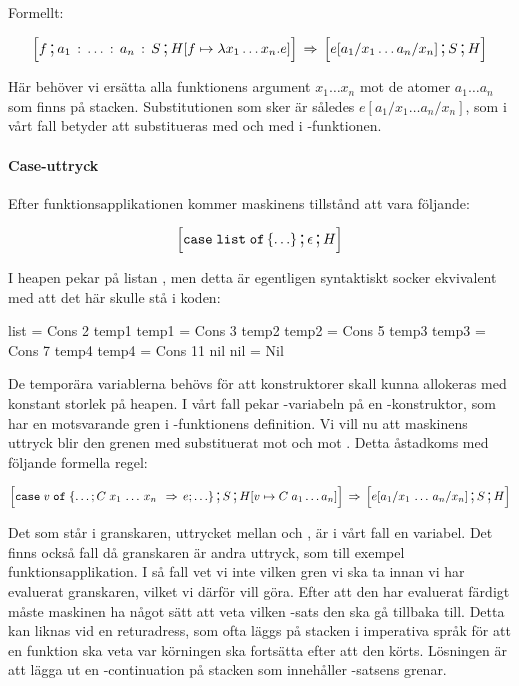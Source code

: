 \documentclass[../Core]{subfiles}
\begin{document}
Formellt:

\[
\text{\large$$}\Big[f \,\text{\Large;}\, a_{1} \,:\, \ldots \,:\, a_{n} \,:\, S \,\text{\Large;}\, H[f\mapsto\lambda x_{1}\ldots x_{n}.e]\Big]\,\Rightarrow\, \text{\large$$}\Big[e[a{}_{1}/x_{1}\ldots a_{n}/x_{n}] \,\text{\Large;}\, S \,\text{\Large;}\, H\Big]
\]


Här behöver vi ersätta alla funktionens argument $x_{1}\ldots x_{n}$ mot
de atomer $a_{1}\ldots a_{n}$ som finns på stacken. Substitutionen som sker är 
således $e[a{}_{1}/x_{1}\ldots a_{n}/x_{n}]$, som i vårt fall betyder att
 substitueras med  och  med  i -funktionen.


\paragraph{Case-uttryck} 
 Efter funktionsapplikationen kommer maskinens tillstånd att vara följande:

\[
\text{\large$$}\Big[\mathtt{case\; list\; of\,\lbrace\ldots\rbrace} \,\text{\Large;}\, \epsilon \,\text{\Large;}\, H\Big]
\]


I heapen pekar  på listan \ic{[2,3,5,7,11]}, men detta är egentligen 
syntaktiskt socker ekvivalent med att det här skulle stå i koden:

\begin{codeEx}
list = Cons 2 temp1
temp1 = Cons 3 temp2
temp2 = Cons 5 temp3
temp3 = Cons 7 temp4
temp4 = Cons 11 nil
nil = Nil
\end{codeEx}

De temporära variablerna behövs för att konstruktorer skall kunna
allokeras med konstant storlek på heapen. I vårt fall pekar
-variabeln på en -konstruktor, som har en motsvarande gren
i -funktionens definition. Vi vill nu att maskinens uttryck
blir den grenen med  substituerat mot  och  mot .
Detta åstadkoms med följande formella regel:

\begin{multline*}
\text{\large$$}\Big[\mathtt{case}\; v\; \mathtt{of}\;\{\ldots;C\; x_{1}\,\ldots\, x_{n}\;\,\Rightarrow\, e;\ldots\} \,\text{\Large;}\, S \,\text{\Large;}\, H[v\mapsto C\; a_{1}\ldots a_{n}]\Big]
\,\Rightarrow\, \text{\large$$}\Big[e[a_{1}/x_{1}\,\ldots\, a_{n}/x_{n}] \,\text{\Large;}\, S \,\text{\Large;}\, H\Big]
\end{multline*}


Det som står i granskaren, uttrycket mellan  och , är i vårt
fall en variabel. Det finns också fall då granskaren är andra uttryck, som
till exempel funktionsapplikation. I så fall vet vi inte vilken gren vi ska
ta innan vi har evaluerat granskaren, vilket vi därför vill göra.
Efter att den har evaluerat färdigt måste maskinen ha något sätt att
veta vilken -sats den ska gå tillbaka till. Detta kan liknas
vid en returadress, som ofta läggs på stacken i imperativa språk för att
en funktion ska veta var körningen ska fortsätta efter att den körts.
Lösningen är att lägga ut en -continuation på stacken
som innehåller -satsens grenar.
\end{document}
